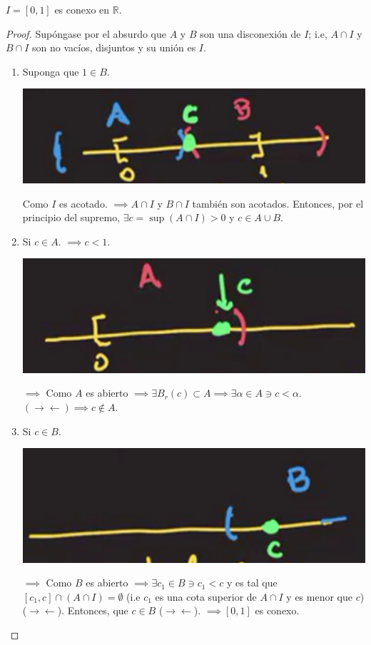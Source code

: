 \begin{teorema}
	$I=[0,1]$ es conexo en $\mathbb{R}$. 
	\begin{proof}
		Supóngase por el absurdo que $A$ y $B$ son una disconexión de $I$; i.e, $A\cap I$ y $B\cap I$ son no vacíos, disjuntos y su unión es $I$. 
		\begin{enumerate}
			\item Suponga que $1\in B$. 
			\begin{center}
				\includegraphics[scale=0.4]{images/2/18}
			\end{center}
			Como $I$ es acotado. $\implies A\cap I$ y $B\cap I$ también son acotados. Entonces, por el principio del supremo, $\exists c=\sup(A\cap I)>0$ y $c\in A\cup B$. 
			\item Si $c\in A$. $\implies c<1$. 
			\begin{center}
				\includegraphics[scale=0.4]{images/2/19}
			\end{center}
	$\implies$ Como $A$ es abierto $\implies \exists B_r(c)\subset A\implies \exists \alpha \in A\ni c<\alpha$. $(\to\gets)\implies c\not\in A$. 
	\item Si $c\in B$. 
	\begin{center}
		\includegraphics[scale=0.4]{images/2/20}
	\end{center}
	$\implies$ Como $B$ es abierto $\implies \exists c_1\in B\ni c_1<c$ y es tal que $[c_1,c]\cap (A\cap I)=\emptyset$ (i.e $c_1$ es una cota superior de $A\cap I$ y es menor que $c$)($\to\gets$). Entonces, que $c\in B$ ($\to\gets$). $\implies [0,1]$ es conexo.
		\end{enumerate}
	\end{proof}
\end{teorema}


